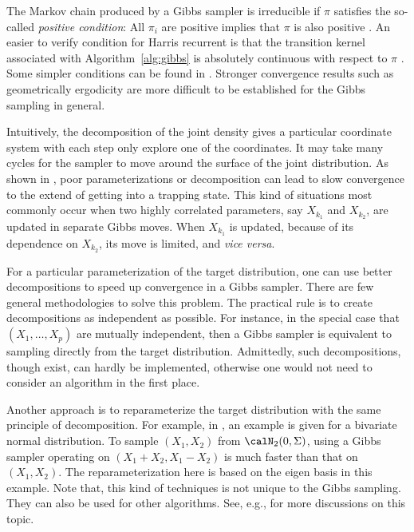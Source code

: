 

The Markov chain produced by a Gibbs sampler is irreducible if $\pi$ satisfies
the so-called \emph{positive condition}: All $\pi_i$ are positive implies that
$\pi$ is also positive \cite[][Theorem~10.8]{Robert:2004tn}. An easier to
verify condition for Harris recurrent is that the transition kernel associated
with Algorithm~\ref{alg:gibbs} is absolutely continuous with respect to $\pi$
\cite{Tierney:1994uk}. Some simpler conditions can be found in
\cite{Hobert:1997vx}. Stronger convergence results such as geometrically
ergodicity are more difficult to be established for the Gibbs sampling in
general.

Intuitively, the decomposition of the joint density gives a particular
coordinate system with each step only explore one of the coordinates. It may
take many cycles for the sampler to move around the surface of the joint
distribution. As shown in \cite[][note~9.7.1]{Robert:2004tn}, poor
parameterizations or decomposition can lead to slow convergence to the extend
of getting into a trapping state. This kind of situations most commonly occur
when two highly correlated parameters, say $X_{k_1}$ and $X_{k_2}$, are
updated in separate Gibbs moves. When $X_{k_1}$ is updated, because of its
dependence on $X_{k_2}$, its move is limited, and \emph{vice versa}.

For a particular parameterization of the target distribution, one can use
better decompositions to speed up convergence in a Gibbs sampler. There are
few general methodologies to solve this problem. The practical rule is to
create decompositions as independent as possible. For instance, in the special
case that $(X_1,\dots,X_p)$ are mutually independent, then a Gibbs sampler is
equivalent to sampling directly from the target distribution. Admittedly, such
decompositions, though exist, can hardly be implemented, otherwise one would
not need to consider an \mcmc algorithm in the first place.

Another approach is to reparameterize the target distribution with the same
principle of decomposition. For example, in
\cite[][sec.~10.4.1]{Robert:2004tn}, an example is given for a bivariate
normal distribution. To sample $(X_1,X_2)$ from $\calN_2(0, \Sigma)$, using a
Gibbs sampler operating on $(X_1 + X_2, X_1 - X_2)$ is much faster than that
on $(X_1,X_2)$. The reparameterization here is based on the eigen basis in
this example. Note that, this kind of techniques is not unique to the Gibbs
sampling. They can also be used for other \mcmc algorithms. See, e.g.,
\cite{Hills:1993vb,Gilks:1996vx} for more discussions on this topic.

